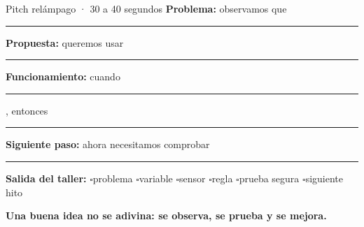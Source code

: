 \documentclass[10pt,a4paper]{article}
\newcommand{\checkline}[1]{$\square$\hspace{1.5mm}#1}
\begin{document}
\begin{fieldbox}[height=54mm]{Pitch relámpago · 30 a 40 segundos}
\textbf{Problema:} observamos que \rule{120mm}{0.35pt}\par\vspace{5mm}
\textbf{Propuesta:} queremos usar \rule{106mm}{0.35pt}\par\vspace{5mm}
\textbf{Funcionamiento:} cuando \rule{46mm}{0.35pt}, entonces \rule{48mm}{0.35pt}\par\vspace{5mm}
\textbf{Siguiente paso:} ahora necesitamos comprobar \rule{87mm}{0.35pt}
\end{fieldbox}

\begin{tcolorbox}[colback=AIEPBlueSoft,colframe=AIEPCyan,boxrule=.6pt,arc=1mm]
\textbf{\color{AIEPNavy}Salida del taller:}\quad
\checkline{problema}\quad
\checkline{variable}\quad
\checkline{sensor}\quad
\checkline{regla}\quad
\checkline{prueba segura}\quad
\checkline{siguiente hito}
\end{tcolorbox}

\begin{tcolorbox}[colback=AIEPNavy,colframe=AIEPNavy,arc=1mm,halign=center]
{\large\bfseries\color{white}Una buena idea no se adivina: se observa, se prueba y se mejora.}
\end{tcolorbox}
\end{document}
